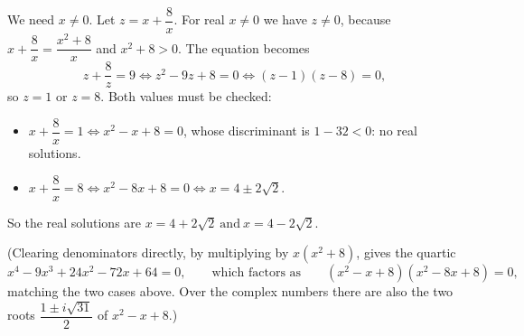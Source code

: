 We need $x\ne0$. Let $z=x+\dfrac8x$. For real $x\ne0$ we have $z\ne0$, because $x+\dfrac8x=\dfrac{x^2+8}{x}$ and $x^2+8>0$. The equation becomes
\[z+\dfrac8z=9\iff z^2-9z+8=0\iff(z-1)(z-8)=0,\]
so $z=1$ or $z=8$. Both values must be checked:
\begin{itemize}
\item $x+\dfrac8x=1\iff x^2-x+8=0$, whose discriminant is $1-32<0$: no real solutions.
\item $x+\dfrac8x=8\iff x^2-8x+8=0\iff x=4\pm2\sqrt2$.
\end{itemize}
So the real solutions are $\boxed{x=4+2\sqrt2\ \text{and}\ x=4-2\sqrt2}$.

(Clearing denominators directly, by multiplying by $x\left(x^2+8\right)$, gives the quartic
\[x^4-9x^3+24x^2-72x+64=0,\qquad\text{which factors as}\qquad\left(x^2-x+8\right)\left(x^2-8x+8\right)=0,\]
matching the two cases above. Over the complex numbers there are also the two roots $\dfrac{1\pm i\sqrt{31}}{2}$ of $x^2-x+8$.)
